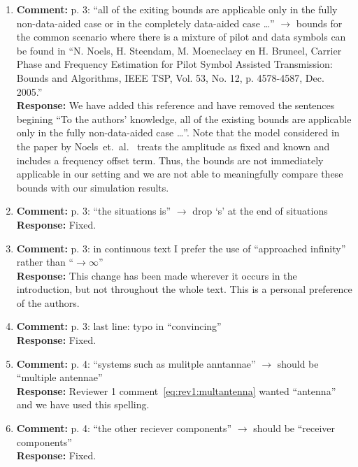 \documentclass{article}
\begin{document}
\begin{enumerate}
\item \textbf{Comment:} p. 3: ``all of the exiting bounds are applicable only in the fully non-data-aided case or in the completely data-aided case \dots'' $\to$ bounds for the common scenario where there is a mixture of pilot and data symbols can be found in ``N. Noels, H. Steendam, M. Moeneclaey en H. Bruneel, Carrier Phase and Frequency Estimation for Pilot Symbol Assisted Transmission: Bounds and Algorithms, IEEE TSP, Vol. 53, No. 12, p. 4578-4587, Dec. 2005.'' \\
\textbf{Response:} We have added this reference and have removed the sentences begining ``To the authors' knowledge, all of the existing bounds are applicable only in the fully non-data-aided case \dots''. Note that the model considered in the paper by Noels~et.~al.~\cite{Noels_crbs_with_pilots_2005} treats the amplitude as fixed and known and includes a frequency offset term.  Thus, the bounds are not immediately applicable in our setting and we are not able to meaningfully compare these bounds with our simulation results.  %

\item \textbf{Comment:} p. 3: ``the situations is'' $\to$ drop `s' at the end of situations \\
\textbf{Response:} Fixed.

\item \textbf{Comment:} p. 3: in continuous text I prefer the use of ``approached infinity'' rather than ``$\to \infty$'' \\
\textbf{Response:} This change has been made wherever it occurs in the introduction, but not throughout the whole text. This is a personal preference of the authors.

\item \textbf{Comment:} p. 3: last line: typo in ``convincing'' \\
\textbf{Response:} Fixed.

\item \textbf{Comment:} p. 4: ``systems such as mulitple anntannae'' $\to$ should be ``multiple antennae'' \\
\textbf{Response:} Reviewer 1 comment~\eqref{eq:rev1:multantenna} wanted ``antenna'' and we have used this spelling.

\item \textbf{Comment:} p. 4: ``the other reciever components'' $\to$ should be ``receiver components'' \\
\textbf{Response:} Fixed.


\end{enumerate}
\end{document}
